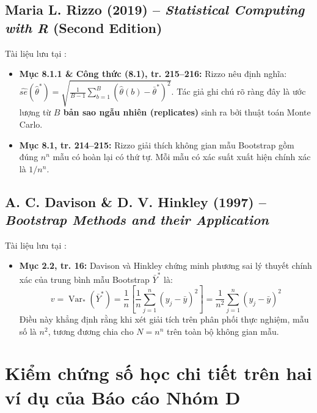\documentclass[10pt,a4paper]{article}
\begin{document}
\subsection{Maria L. Rizzo (2019) -- \textit{Statistical Computing with R} (Second Edition)}
Tài liệu lưu tại :
\begin{itemize}
    \item \textbf{Mục 8.1.1 \& Công thức (8.1), tr. 215--216:}
    Rizzo nêu định nghĩa: $\widehat{se}(\hat\theta^*) = \sqrt{\frac{1}{B-1}\sum_{b=1}^B (\hat\theta(b) - \bar\theta^*)^2}$. Tác giả ghi chú rõ ràng đây là ước lượng từ \textbf{$B$ bản sao ngẫu nhiên (replicates)} sinh ra bởi thuật toán Monte Carlo.
    \item \textbf{Mục 8.1, tr. 214--215:}
    Rizzo giải thích không gian mẫu Bootstrap gồm đúng $n^n$ mẫu có hoàn lại có thứ tự. Mỗi mẫu có xác suất xuất hiện chính xác là $1/n^n$.
\end{itemize}

\subsection{A. C. Davison \& D. V. Hinkley (1997) -- \textit{Bootstrap Methods and their Application}}
Tài liệu lưu tại :
\begin{itemize}
    \item \textbf{Mục 2.2, tr. 16:}
    Davison và Hinkley chứng minh phương sai lý thuyết chính xác của trung bình mẫu Bootstrap $\bar Y^*$ là:
    \begin{equation}
        v = \operatorname{Var}_*(\bar Y^*) = \frac{1}{n}\left[\frac{1}{n}\sum_{j=1}^n (y_j - \bar y)^2\right] = \frac{1}{n^2}\sum_{j=1}^n (y_j - \bar y)^2
    \end{equation}
    Điều này khẳng định rằng khi xét giải tích trên phân phối thực nghiệm, mẫu số là $n^2$, tương đương chia cho $N = n^n$ trên toàn bộ không gian mẫu.
\end{itemize}

\section{Kiểm chứng số học chi tiết trên hai ví dụ của Báo cáo Nhóm D}
\end{document}
